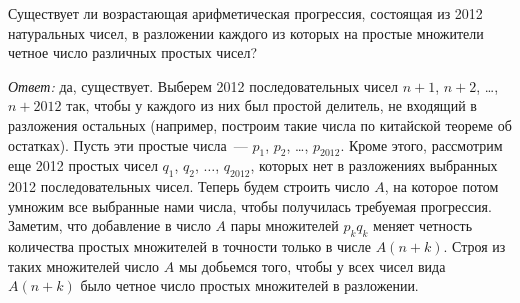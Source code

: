 \problem
{}
Существует ли возрастающая арифметическая прогрессия, состоящая из 2012
натуральных чисел, в разложении каждого из которых на простые множители четное
число различных простых чисел?

\solution
\emph{Ответ:} да, существует.
Выберем 2012 последовательных чисел $n + 1$, $n + 2$, \ldots, $n + 2012$ так,
чтобы у каждого из них был простой делитель, не входящий в разложения остальных
(например, построим такие числа по китайской теореме об остатках).
Пусть эти простые числа~--- $p_1$, $p_2$, \ldots, $p_{2012}$.
Кроме этого, рассмотрим еще 2012 простых чисел
$q_1$, $q_2$, $\ldots$, $q_{2012}$,
которых нет в разложениях выбранных 2012 последовательных чисел.
Теперь будем строить число $A$, на которое потом умножим все выбранные нами
числа, чтобы получилась требуемая прогрессия.
Заметим, что добавление в число $A$ пары множителей $p_k q_k$ меняет четность
количества простых множителей в точности только в числе $A (n + k)$.
Строя из таких множителей число $A$ мы добьемся того, чтобы у всех чисел вида
$A (n + k)$ было четное число простых множителей в разложении.

\endproblem
